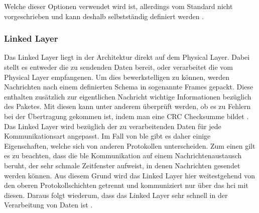 \noindent Welche dieser Optionen verwendet wird ist, allerdings vom Standard nicht vorgeschrieben und kann deshalb selbstständig definiert werden \cite[Seite 411]{Sauter18:GMK}.\\

\noindent 

\subsubsection{Linked Layer}
\label{sss:funktionsweise:linked}

Das Linked Layer liegt in der Architektur direkt auf dem Physical Layer. Dabei stellt es entweder die zu sendenden Daten bereit, oder verarbeitet die vom Physical Layer empfangenen. Um dies bewerkstelligen zu können, werden Nachrichten nach einem definierten Schema in sogenannte Frames gepackt. Diese enthalten zusätzlich zur eigentlichen Nachricht wichtige Informationen bezüglich des Paketes. Mit diesen kann unter anderem überprüft werden, ob es zu Fehlern bei der Übertragung gekommen ist, indem man eine CRC Checksumme bildet \cite[Seite 194]{Tanenbaum14:CN}.\\

\noindent Das Linked Layer wird bezüglich der zu verarbeitenden Daten für jede Kommunikationsart angepasst. Im Fall von \ac{ble} gibt es daher einige Eigenschaften, welche sich von anderen Protokollen unterscheiden. Zum einen gilt es zu beachten, dass die \ac{ble} Kommunikation auf einem Nachrichtenaustausch beruht, der sehr schmale Zeitfenster aufweist, in denen Nachrichten gesendet werden können. Aus diesem Grund wird das Linked Layer hier weitestgehend von den oberen Protokollschichten getrennt und kommuniziert nur über das \ac{hci} mit diesen. Daraus folgt wiederum, dass das Linked Layer sehr schnell in der Verarbeitung von Daten ist \cite[Seite 17f]{Townsend14:GSB}.\\

